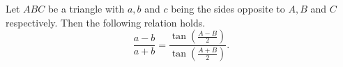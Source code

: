 \documentclass[12pt]{article}
\begin{document}
Let $ABC$ be a triangle with $a, b$ and $c$ being the sides opposite to $A, B$ and $C$ respectively.
Then the following relation holds.
$$\frac{a-b}{a+b} = \frac{\tan(\frac{A-B}{2})}{\tan(\frac{A+B}{2})}.$$
\end{document}
